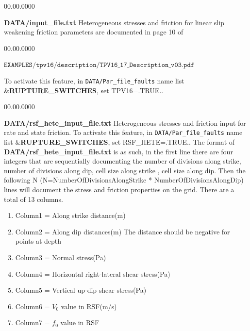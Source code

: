 \begin{lyxlist}{00.00.0000}
\item [{\textbf{DATA/input\_file.txt}}] Heterogeneous stresses and friction for
linear slip weakening friction
parameters are documented in page 10 of

\begin{lyxlist}{00.00.0000}
\item [{$\mathtt{EXAMPLES/tpv16/description/TPV16\_17\_Description\_v03.pdf}$}]~
\end{lyxlist}

To activate this feature, in \texttt{DATA/Par\_file\_faults} name list \&\textbf{RUPTURE\_SWITCHES}, set TPV16=.TRUE..

\end{lyxlist}
\begin{lyxlist}{00.00.0000}
\item [{\textbf{DATA/rsf\_hete\_input\_file.txt}}]  Heterogeneous stresses and friction input for
  rate and state friction.
To activate this feature, in \texttt{DATA/Par\_file\_faults} name list \&\textbf{RUPTURE\_SWITCHES}, set RSF\_HETE=.TRUE..
  The format of  {\textbf{DATA/rsf\_hete\_input\_file.txt}} is as such, in the first line there are four integers
  that are sequentially documenting the number of divisions along strike, number of divisions along
  dip, cell size along strike , cell size along dip. Then the following N (N=NumberOfDivisionsAlongStrike
  * NumberOfDivisionsAlongDip) lines will document the stress and friction properties on the grid.
  There are a total of 13 columns.
  \begin{enumerate}
  \item{Column1} = Along strike distance(m)

  \item{Column2} = Along dip distances(m) The distance should be negative for points at depth

  \item{Column3} = Normal stress(Pa)

  \item{Column4} = Horizontal right-lateral shear stress(Pa)

  \item{Column5} = Vertical up-dip shear stress(Pa)

  \item{Column6} = $V_0$ value in RSF(m/s)

  \item{Column7} = $f_0$ value in RSF


\end{enumerate}
\end{lyxlist}

